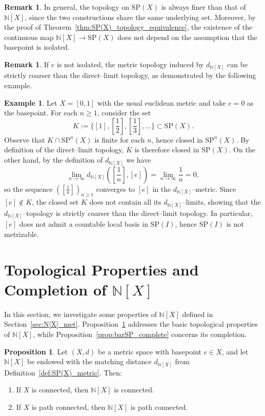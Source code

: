 \documentclass[10pt,a4paper]{article}
\theoremstyle{definition}
\newtheorem{proposition}[theorem]{Proposition}
\newtheorem{remark}[theorem]{Remark}
\newtheorem{example}[theorem]{Example}
\newcommand{\SP}{\mathrm{SP}}
\newcommand{\N}{\mathbb{N}}
\begin{document}
\begin{remark}
In general, the topology on $\SP(X)$ is always finer than that of $\N[X]$,
since the two constructions share the same underlying set. Moreover, by the
proof of Theorem~\ref{thm:SP(X)_topology_equivalence}, the existence of the
continuous map $\N[X] \to \SP(X)$ does not depend on the assumption that the
basepoint is isolated.
\end{remark}


\begin{remark} 
If $e$ is not isolated, the metric topology induced by $d_{\N[X]}$ can be 
strictly coarser than the direct--limit topology, as demonstrated by the
following example.

\begin{example}\label{example:non_met}
Let $X=[0,1]$ with the usual euclidean metric and take $e=0$ as the basepoint.
For each $n\ge 1$, consider the set
\[
K := \{[1], [\frac{1}{2}], [\frac{1}{3}], \dots\} \subset \SP(X).
\]
Observe that $K \cap \SP^{n}(X)$ is finite for each $n$, hence closed in
$\SP^{n}(X)$. By definition of the direct--limit topology, $K$ is therefore
closed in $\SP(X)$. On the other hand, by the definition of $d_{\N[X]}$ we have
\[
\lim_{n\to\infty} d_{\N[X]}([\frac{1}{n}],[e]) = \lim_{n\to\infty} \frac{1}{n} = 0,
\]
so the sequence $([\frac{1}{n}])_{n\ge 1}$ converges to $[e]$ in the $d_{\N[X]}$--metric.
Since $[e]\notin K$, the closed set $K$ does not contain all its $d_{\N[X]}$--limits,
showing that the $d_{\N[X]}$--topology is strictly coarser than the direct--limit
topology. In particular, $[e]$ does not admit a countable local basis in $\SP(I)$, hence $\SP(I)$ is not metrizable.
\end{example}
\end{remark}


\section{Topological Properties and Completion of ${\N[X]}$}
In this section, we investigate some properties of $\N[X]$ defined in
Section~\ref{sec:N[X]_met}. Proposition~\ref{prop:SPX_connectedness_family} addresses the basic topological
properties of $\N[X]$, while Proposition~\ref{prop:barSP_complete} concerns its
completion.

\begin{proposition}\label{prop:SPX_connectedness_family}
Let $(X,d)$ be a metric space with basepoint $e\in X$, and let $\N[X]$ be
endowed with the matching distance $d_{\N[X]}$ from
Definition~\ref{def:SP(X)_metric}. Then:
\begin{enumerate}[label=(\roman*)]
    \item\label{item:N[X]_top_1} If $X$ is connected, then $\N[X]$ is connected.
    \item\label{item:N[X]_top_2} If $X$ is path connected, then $\N[X]$ is path connected.
\end{enumerate}
\end{proposition}
\end{document}
